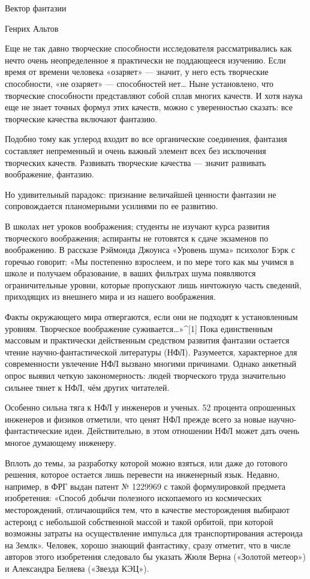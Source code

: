 
Вектор фантазии

Генрих Альтов


Еще не так давно творческие способности исследователя рассматривались  как
нечто очень  неопределенное я  практически не  поддающееся изучению.  Если
время от  времени человека  «озаряет»  — значит,  у него  есть  творческие
способности, «не  озаряет»  —  способностей  нет…  Ныне  установлено,  что
творческие способности  представляют собой  сплав многих  качеств. И  хотя
наука еще  не  знает точных  формул  этих качеств,  можно  с  уверенностью
сказать: все творческие качества включают фантазию.

Подобно тому как углерод входит  во все органические соединения,  фантазия
составляет  непременный  и  очень  важный  элемент  всех  без   исключения
творческих качеств.  Развивать  творческие  качества  —  значит  развивать
воображение, фантазию.

Но  удивительный  парадокс:  признание  величайшей  ценности  фантазии  не
сопровождается планомерными усилиями по ее развитию.

В школах  нет  уроков  воображения; студенты  не  изучают  курса  развития
творческого воображения;  аспиранты  не  готовятся к  сдаче  экзаменов  по
воображению. В рассказе  Рэймонда Джоунса «Уровень  шума» психолог Бэрк  с
горечью говорит: «Мы постепенно взрослеем, и по мере того как мы учимся  в
школе  и   получаем  образование,   в  ваших   фильтрах  шума   появляются
ограничительные уровни, которые пропускают лишь ничтожную часть  сведений,
приходящих из внешнего мира и из нашего воображения.

Факты окружающего мира отвергаются, если  они не подходят к  установленным
уровням.  Творческое   воображение  суживается…»^[1]   Пока   единственным
массовым и практически  действенным средством  развития фантазии  остается
чтение научно-фантастической литературы (НФЛ). Разумеется, характерное для
современности увлечение  НФЛ вызвано  многими причинами.  Однако  анкетный
опрос выявил четкую  закономерность: людей  творческого труда  значительно
сильнее тянет к НФЛ, чём других читателей.

Особенно сильна тяга к  НФЛ у инженеров и  ученых. 52 процента  опрошенных
инженеров и  физиков  отметили,  что  ценят  НФЛ  прежде  всего  за  новые
научно-фантастические идеи. Действительно, в этом отношении НФЛ может дать
очень многое думающему инженеру.

Вплоть до темы, за разработку которой можно взяться, или даже до  готового
решения, которое  остается лишь  перевести  на инженерный  язык.  Недавно,
например, в  ФРГ выдан  патент №  1229969 с  такой формулировкой  предмета
изобретения:  «Способ   добычи   полезного  ископаемого   из   космических
месторождений, отличающийся  тем, что  в качестве  месторождения  выбирают
астероид с  небольшой  собственной массой  и  такой орбитой,  при  которой
возможны затраты на осуществление импульса для транспортирования астероида
на Землк». Человек, хорошо знающий фантастику, сразу отметит, что в  числе
авторов этого  изобретения  следовало  бы  указать  Жюля  Верна  («Золотой
метеор») и Александра Беляева («Звезда КЭЦ»).

